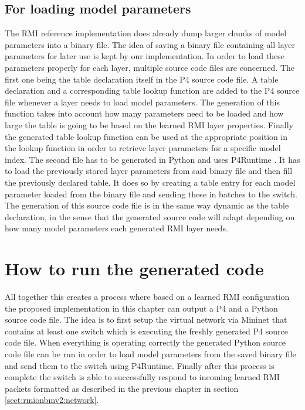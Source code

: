 \subsection{For loading model parameters}
\label{sect:rmiforp4:parameters}
The RMI reference implementation does already dump larger chunks of model parameters into a binary file. The idea of saving a binary file containing all layer parameters for later use is kept by our implementation. In order to load these parameters properly for each layer, multiple source code files are concerned. The first one being the table declaration itself in the P4 source code file. A table declaration and a corresponding table lookup function are added to the P4 source file whenever a layer needs to load model parameters. The generation of this function takes into account how many parameters need to be loaded and how large the table is going to be based on the learned RMI layer properties. Finally the generated table lookup function can be used at the appropriate position in the lookup function in order to retrieve layer parameters for a specific model index. The second file has to be generated in Python and uses P4Runtime \cite{p4runtime-spec}. It has to load the previously stored layer parameters from said binary file and then fill the previously declared table. It does so by creating a table entry for each model parameter loaded from the binary file and sending these in batches to the switch. The generation of this source code file is in the same way dynamic as the table declaration, in the sense that the generated source code will adapt depending on how many model parameters each generated RMI layer needs.

\section{How to run the generated code}
All together this creates a process where based on a learned RMI configuration the proposed implementation in this chapter can output a P4 and a Python source code file. The idea is to first setup the virtual network via Mininet that contains at least one switch which is executing the freshly generated P4 source code file. When everything is operating correctly the generated Python source code file can be run in order to load model parameters from the saved binary file and send them to the switch using P4Runtime. Finally after this process is complete the switch is able to successfully respond to incoming learned RMI packets formatted as described in the previous chapter in section \ref{sect:rmionbmv2:network}.

